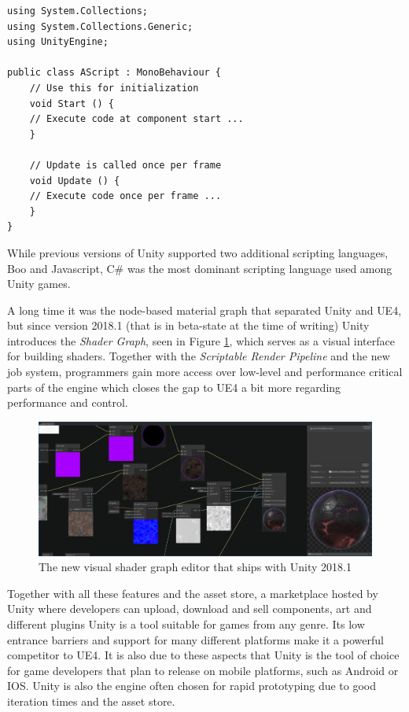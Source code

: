 \clearpage

\begin{lstlisting}[language={[Sharp]C}, frame=single, caption={Example of an empty C\# script in Unity}, label={Script}]
using System.Collections;
using System.Collections.Generic;
using UnityEngine;

public class AScript : MonoBehaviour {
	// Use this for initialization
	void Start () {
	// Execute code at component start ...
	}
	
	// Update is called once per frame
	void Update () {
	// Execute code once per frame ...
	}
}
\end{lstlisting}

While previous versions of Unity supported two additional scripting languages, Boo and Javascript, C\# was the most dominant scripting language used among Unity games. 

A long time it was the node-based material graph that separated Unity and \ac{UE4}, but since version 2018.1 (that is in beta-state at the time of writing) Unity introduces the \textit{Shader Graph}, seen in Figure \ref{fig:unity_shader_graph}, which serves as a visual interface for building shaders. Together with the \textit{Scriptable Render Pipeline} and the new job system, programmers gain more access over low-level and performance critical parts of the engine which closes the gap to \ac{UE4} a bit more regarding performance and control.

\begin{figure}[h!]
	\includegraphics[width=\linewidth]{PICs/unity_shader_graph.png}
	\caption{The new visual shader graph editor that ships with Unity 2018.1}
	\label{fig:unity_shader_graph}
\end{figure}

\noindent

Together with all these features and the asset store, a marketplace hosted by Unity where developers can upload, download and sell components, art and different plugins Unity is a tool suitable for games from any genre. Its low entrance barriers and support for many different platforms make it a powerful competitor to \ac{UE4}. It is also due to these aspects that Unity is the tool of choice for game developers that plan to release on mobile platforms, such as Android or IOS. Unity is also the engine often chosen for rapid prototyping due to good iteration times and the asset store.

